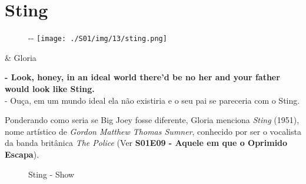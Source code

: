 \hypertarget{sting}{%
\section{Sting}\label{sting}}

\begin{figure}[!ht]
  \begin{adjustwidth}{-\oddsidemargin-1in}{-\rightmargin}
    \centering
    \texttt{[image: ./S01/img/13/sting.png]}
  \end{adjustwidth}
\end{figure}

\begin{tcolorbox}[enhanced,center upper,
    drop fuzzy shadow southeast, boxrule=0.3pt,
    lower separated=false,
    colframe=black!30!dialogoBorder,colback=white]
\begin{minipage}[c]{0.16\linewidth}
   & \centering \scriptsize{Gloria}
\end{minipage}
\hfill
\begin{minipage}[c]{0.8\linewidth}
  \textbf{- Look, honey, in an ideal world there'd be no her and your father would look like Sting.}\\
  - Ouça, em um mundo ideal ela não existiria e o seu pai se pareceria com o Sting.
\end{minipage}
\end{tcolorbox}

Ponderando como seria se Big Joey fosse diferente, Gloria menciona
\emph{Sting} (1951), nome artístico de \emph{Gordon Matthew Thomas
Sumner}, conhecido por ser o vocalista da banda britânica \emph{The
Police} (Ver
\textbf{\textcolor{primarycolor}{S01E09 - Aquele em que o Oprimido Escapa}}).

\begin{figure}
  \centering
    \caption{Sting - Show\label{fig:sting-show}}
\end{figure}

